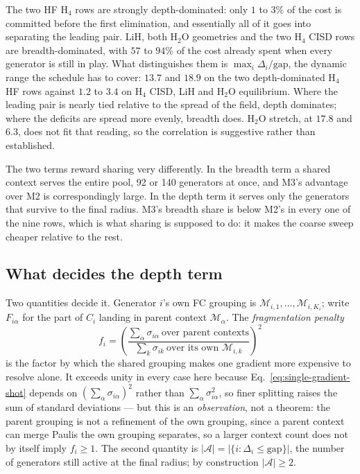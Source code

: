 \documentclass[10pt]{article}
\begin{document}
The two HF H$_4$ rows are strongly depth-dominated: only $1$ to $3\%$ of
the cost is committed before the first elimination, and essentially all of it
goes into separating the leading pair. LiH, both H$_2$O geometries and the two
H$_4$ CISD rows are breadth-dominated, with $57$ to $94\%$ of the cost
already spent when every generator is still in play. What distinguishes them is
$\max_i\Delta_i/\mathrm{gap}$, the dynamic range the schedule has to cover:
$13.7$ and $18.9$ on the two depth-dominated H$_4$ HF rows against $1.2$ to
$3.4$ on H$_4$ CISD, LiH and H$_2$O equilibrium. Where the leading pair is
nearly tied relative to the spread of the field, depth dominates; where the
deficits are spread more evenly, breadth does. H$_2$O stretch, at $17.8$ and
$6.3$, does not fit that reading, so the correlation is suggestive rather than
established.

The two terms reward sharing very differently. In the breadth term a shared
context serves the entire pool, 92 or 140 generators at once, and M3's advantage
over M2 is correspondingly large. In the depth term it serves only the generators
that survive to the final radius. M3's breadth share is below M2's in every one of
the nine rows, which is what sharing is supposed to do: it makes the coarse sweep
cheaper relative to the rest.

\subsection{What decides the depth term}
\label{sec:fragmentation}

Two quantities decide it. Generator $i$'s own FC grouping is
$\mathcal M_{i,1},\ldots,\mathcal M_{i,K_i}$; write $F_{i\alpha}$ for the part of
$C_i$ landing in parent context $\mathcal M_\alpha$. The \emph{fragmentation
penalty}
\begin{equation}
  f_i=\left(\frac{\sum_{\alpha}\sigma_{i\alpha}\ \text{over parent contexts}}
                 {\sum_{k}\sigma_{i k}\ \text{over its own } \mathcal M_{i,k}}\right)^{2}
  \label{eq:fragmentation}
\end{equation}
is the factor by which the shared grouping makes one gradient more expensive to
resolve alone. It exceeds unity in every case here because
Eq.~\eqref{eq:single-gradient-shot} depends on $(\sum_\alpha\sigma_{i\alpha})^2$
rather than $\sum_\alpha\sigma_{i\alpha}^2$, so finer splitting raises the sum of
standard deviations --- but this is an \emph{observation}, not a theorem: the
parent grouping is not a refinement of the own grouping, since a parent context
can merge Paulis the own grouping separates, so a larger context count does not
by itself imply $f_i\ge1$. The second quantity is
$|\mathcal A|=|\{i:\Delta_i\le\mathrm{gap}\}|$, the number of generators still
active at the final radius; by construction $|\mathcal A|\ge2$.
\end{document}
